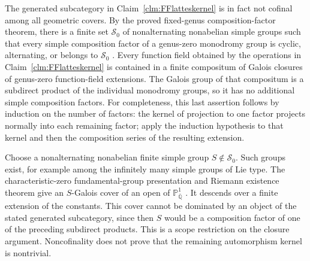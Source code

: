 The generated subcategory in Claim~\ref{clm:FFlatteskernel}
is in fact not cofinal among all geometric covers.
By the proved fixed-genus composition-factor theorem,
there is a finite set \(\mathcal S_0\) of
nonalternating nonabelian simple groups such that every
simple composition factor of a genus-zero monodromy
group is cyclic, alternating, or belongs to
\(\mathcal S_0\)
\citep[Theorem~1.1, with characteristic zero and genus
zero]{FF_Guralnick2003}.
Every function field obtained by the operations in
Claim~\ref{clm:FFlatteskernel} is contained in a finite
compositum of Galois closures of genus-zero function-field
extensions. The Galois group of that compositum is a
subdirect product of the individual monodromy groups,
so it has no additional simple composition factors.
For completeness, this last assertion follows by induction
on the number of factors: the kernel of projection to
one factor projects normally into each remaining factor;
apply the induction hypothesis to that kernel and then
the composition series of the resulting extension.

Choose a nonalternating nonabelian finite simple group
\(S\notin\mathcal S_0\). Such groups exist, for
example among the infinitely many simple groups of
Lie type. The characteristic-zero fundamental-group
presentation and Riemann existence theorem give an
\(S\)-Galois cover of an open of
\(\mathbb P^1_{\overline{\mathbb Q}}\)
\citep[Expos\'es~XII, Th\'eor\`eme~5.1, and~XIII,
Corollaire~2.12]{FF_SGA1}.
It descends over a finite extension of the constants.
This cover cannot be dominated by an object of the
stated generated subcategory, since then \(S\)
would be a composition factor of one of the preceding
subdirect products. This is a scope restriction on the
closure argument. Noncofinality does not prove that the
remaining automorphism kernel is nontrivial.
